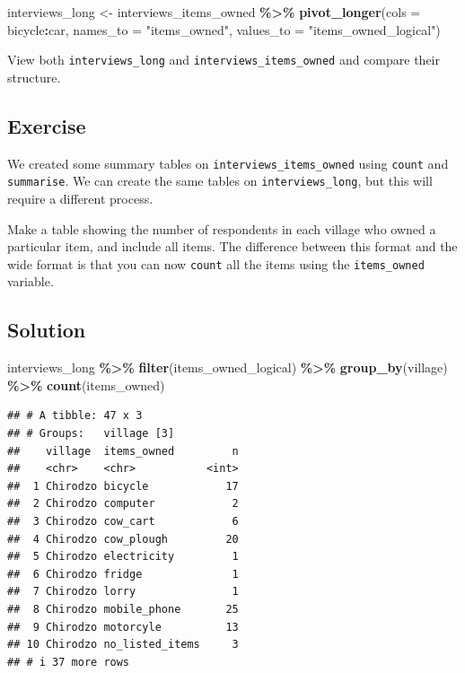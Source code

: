 \documentclass[
]{article}
\newenvironment{Shaded}{\begin{snugshade}}{\end{snugshade}}
\newcommand{\AttributeTok}[1]{\textcolor[rgb]{0.13,0.29,0.53}{#1}}
\newcommand{\FunctionTok}[1]{\textcolor[rgb]{0.13,0.29,0.53}{\textbf{#1}}}
\newcommand{\NormalTok}[1]{#1}
\newcommand{\OtherTok}[1]{\textcolor[rgb]{0.56,0.35,0.01}{#1}}
\newcommand{\SpecialCharTok}[1]{\textcolor[rgb]{0.81,0.36,0.00}{\textbf{#1}}}
\newcommand{\StringTok}[1]{\textcolor[rgb]{0.31,0.60,0.02}{#1}}
\begin{document}
\begin{Shaded}
\begin{Highlighting}[]
\NormalTok{interviews\_long }\OtherTok{\textless{}{-}}\NormalTok{ interviews\_items\_owned }\SpecialCharTok{\%\textgreater{}\%}
  \FunctionTok{pivot\_longer}\NormalTok{(}\AttributeTok{cols =}\NormalTok{ bicycle}\SpecialCharTok{:}\NormalTok{car,}
               \AttributeTok{names\_to =} \StringTok{"items\_owned"}\NormalTok{,}
               \AttributeTok{values\_to =} \StringTok{"items\_owned\_logical"}\NormalTok{)}
\end{Highlighting}
\end{Shaded}

View both \texttt{interviews\_long} and
\texttt{interviews\_items\_owned} and compare their structure.

\subsection{Exercise}\label{exercise-1}

We created some summary tables on \texttt{interviews\_items\_owned}
using \texttt{count} and \texttt{summarise}. We can create the same
tables on \texttt{interviews\_long}, but this will require a different
process.

Make a table showing the number of respondents in each village who owned
a particular item, and include all items. The difference between this
format and the wide format is that you can now \texttt{count} all the
items using the \texttt{items\_owned} variable.

\subsection{Solution}\label{solution-1}

\begin{Shaded}
\begin{Highlighting}[]
\NormalTok{interviews\_long }\SpecialCharTok{\%\textgreater{}\%}
  \FunctionTok{filter}\NormalTok{(items\_owned\_logical) }\SpecialCharTok{\%\textgreater{}\%} 
  \FunctionTok{group\_by}\NormalTok{(village) }\SpecialCharTok{\%\textgreater{}\%} 
  \FunctionTok{count}\NormalTok{(items\_owned)}
\end{Highlighting}
\end{Shaded}

\begin{verbatim}
## # A tibble: 47 x 3
## # Groups:   village [3]
##    village  items_owned         n
##    <chr>    <chr>           <int>
##  1 Chirodzo bicycle            17
##  2 Chirodzo computer            2
##  3 Chirodzo cow_cart            6
##  4 Chirodzo cow_plough         20
##  5 Chirodzo electricity         1
##  6 Chirodzo fridge              1
##  7 Chirodzo lorry               1
##  8 Chirodzo mobile_phone       25
##  9 Chirodzo motorcyle          13
## 10 Chirodzo no_listed_items     3
## # i 37 more rows
\end{verbatim}
\end{document}
